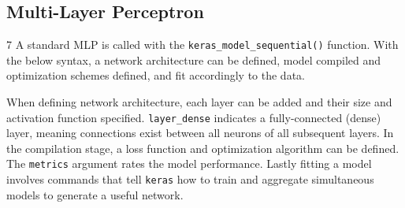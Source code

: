 
\subsection{Multi-Layer Perceptron}

7
A standard MLP is called with the \texttt{keras\_model\_sequential()}
function. With the below syntax, a network architecture can be defined,
model compiled and optimization schemes defined, and fit accordingly to
the data.

\begin{Shaded}
\begin{Highlighting}[]
\OtherTok{\textless{}{-}} \NormalTok{()           }
\SpecialCharTok{\%\textgreater{}\%}
      \NormalTok{(} \NormalTok{, } \NormalTok{, } \NormalTok{(}\NormalTok{)) }\SpecialCharTok{\%\textgreater{}\%}
      \NormalTok{(} \NormalTok{, } \NormalTok{) }\SpecialCharTok{\%\textgreater{}\%} 
          \NormalTok{(} \NormalTok{,      }
           \NormalTok{,}
           \NormalTok{) }\SpecialCharTok{\%\textgreater{}\%} 
               \NormalTok{,}
               \NormalTok{,}
               \NormalTok{)}
\end{Highlighting}
\end{Shaded}

When defining network architecture, each layer can be added and their
size and activation function specified. \texttt{layer\_dense} indicates
a fully-connected (dense) layer, meaning connections exist between all
neurons of all subsequent layers. In the compilation stage, a loss
function and optimization algorithm can be defined. The \texttt{metrics}
argument rates the model performance. Lastly fitting a model involves
commands that tell \texttt{keras} how to train and aggregate
simultaneous models to generate a useful network.



